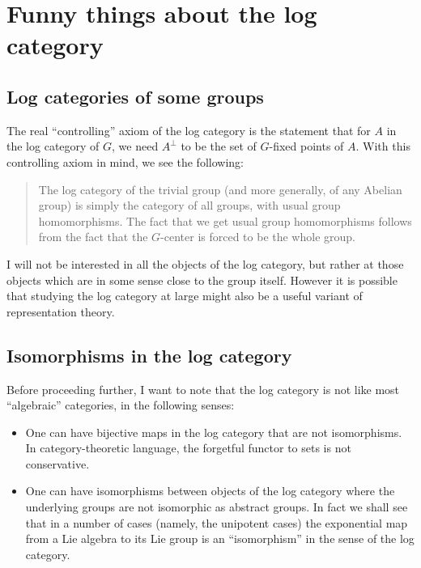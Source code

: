 \documentclass[a4paper]{amsart}
\begin{document}
\section{Funny things about the log category}

\subsection{Log categories of some groups}

The real ``controlling'' axiom of the log category is the statement
that for $A$ in the log category of $G$, we need $A^\perp$ to be the
set of $G$-fixed points of $A$. With this controlling axiom in mind,
we see the following:

\begin{quote}
  The log category of the trivial group (and more generally, of any
  Abelian group) is simply the category of all groups, with usual
  group homomorphisms. The fact that we get usual group homomorphisms
  follows from the fact that the $G$-center is forced to be the whole
  group.
\end{quote}

I will not be interested in all the objects of the log category, but
rather at those objects which are in some sense close to the group
itself. However it is possible that studying the log category at large
might also be a useful variant of representation theory.

\subsection{Isomorphisms in the log category}

Before proceeding further, I want to note that the log category is not
like most ``algebraic'' categories, in the following senses:

\begin{itemize}

\item One can have bijective maps in the log category that are not
  isomorphisms. In category-theoretic language, the forgetful functor
  to sets is not conservative.

\item One can have isomorphisms between objects of the log category
  where the underlying groups are not isomorphic as abstract
  groups. In fact we shall see that in a number of cases (namely, the
  unipotent cases) the exponential map from a Lie algebra to its Lie group
  is an ``isomorphism'' in the sense of the log category.

\end{itemize}
\end{document}
